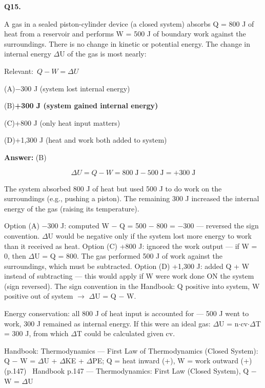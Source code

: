 \documentclass[11pt]{article}
\newcommand{\correct}[1]{\textbf{#1}\;{\color{accent}$\checkmark$}}
\newcommand{\optline}[2]{\par\noindent\hspace{1.2em}(#1)\hspace{0.6em}#2}
\begin{document}
\vspace{9pt}
\filbreak
\textbf{\color{accent}Q15.}\par\vspace{2pt}
A gas in a sealed piston-cylinder device (a closed system) absorbs Q = 800 J of heat from a reservoir and performs W = 500 J of boundary work against the surroundings. There is no change in kinetic or potential energy. The change in internal energy $\Delta$U of the gas is most nearly:\par\vspace{3pt}
{\small\color{soft}Relevant:}\ $Q - W = \Delta U$\par\vspace{3pt}
\optline{A}{$-$300 J (system lost internal energy)}
\optline{B}{\correct{+300 J (system gained internal energy)}}
\optline{C}{+800 J (only heat input matters)}
\optline{D}{+1,300 J (heat and work both added to system)}
\par\vspace{3pt}
\vspace{2pt}\par\noindent\colorbox{boxbg}{\parbox{\dimexpr\linewidth-2\fboxsep\relax}{%
\vspace{2pt}\textbf{Answer:} (B)\par\vspace{2pt}
{\small \[\Delta U = Q - W = 800\;\text{J} - 500\;\text{J} = +300\;\text{J}\]

The system absorbed 800 J of heat but used 500 J to do work on the surroundings (e.g., pushing a piston). The remaining 300 J increased the internal energy of the gas (raising its temperature).

Option (A) $-$300 J: computed W $-$ Q = 500 $-$ 800 = $-$300 --- reversed the sign convention. $\Delta$U would be negative only if the system lost more energy to work than it received as heat. Option (C) +800 J: ignored the work output --- if W = 0, then $\Delta$U = Q = 800. The gas performed 500 J of work against the surroundings, which must be subtracted. Option (D) +1,300 J: added Q + W instead of subtracting --- this would apply if W were work done ON the system (sign reversed). The sign convention in the Handbook: Q positive into system, W positive out of system $\rightarrow$ $\Delta$U = Q $-$ W.

Energy conservation: all 800 J of heat input is accounted for --- 500 J went to work, 300 J remained as internal energy. If this were an ideal gas: $\Delta$U = n$\cdot$cv$\cdot$$\Delta$T = 300 J, from which $\Delta$T could be calculated given cv.}\par\vspace{2pt}
{\footnotesize\color{soft}Handbook: Thermodynamics --- First Law of Thermodynamics (Closed System): Q $-$ W = $\Delta$U + $\Delta$KE + $\Delta$PE; Q = heat inward (+), W = work outward (+) (p.147) \textbullet\ Handbook p.147 --- Thermodynamics: First Law (Closed System), Q $-$ W = $\Delta$U}\vspace{2pt}
}}
\end{document}

